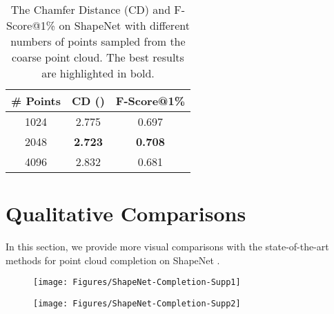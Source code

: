 \documentclass[runningheads]{llncs}
\begin{document}
\begin{table*}[!t]
  \setlength\tabcolsep{12pt}
  \caption{The Chamfer Distance (CD) and F-Score@1\% on ShapeNet with different numbers of points sampled from the coarse point cloud. The best results are highlighted in bold.}
  \centering
  \begin{tabular}{c|cc}
    \toprule
    \# Points  & CD () & F-Score@1\% \\
    \midrule
    1024       & 2.775                 & 0.697 \\
    2048       & \bf{2.723}            & \bf{0.708} \\
    4096       & 2.832                 & 0.681 \\
    \bottomrule
  \end{tabular}
  \label{tab:ablation-study-number-of-pts}
\end{table*}

\clearpage
\section{Qualitative Comparisons}
\label{sec:qualitative-comparisons}

In this section, we provide more visual comparisons with the state-of-the-art methods \cite{DBLP:conf/ThreeDim/YuanKHMH18,DBLP:conf/cvpr/GroueixFKRA18,DBLP:conf/cvpr/YangFST18,DBLP:conf/cvpr/TchapmiKR0S19,DBLP:conf/aaai/LiuSYSH20} for point cloud completion on ShapeNet \cite{DBLP:conf/cvpr/WuSKYZTX15}.

\vspace{-4 mm}
\begin{figure*}[!h]
  \resizebox{\linewidth}{!} {
    \texttt{[image: Figures/ShapeNet-Completion-Supp1]}
  }
\end{figure*}

\begin{figure*}[!h]
  \resizebox{\linewidth}{!} {
    \texttt{[image: Figures/ShapeNet-Completion-Supp2]}
  }
\end{figure*}
\end{document}
